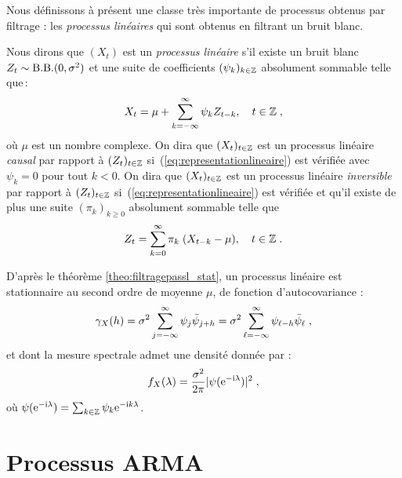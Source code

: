 Nous d\'efinissons \`a pr\'esent une classe tr\`es importante de processus
obtenus par filtrage : les \emph{processus lin\'eaires} qui sont obtenus
en filtrant un bruit blanc.
\begin{definition}
\label{def:proc_lin}
Nous dirons que $(X_{t})$ est un \emph{processus lin\'eaire} s'il existe
un bruit blanc $Z_{t} \sim \mathrm{B.B.}(0,\sigma^2)$ et une suite de coefficients
$(\psi_k)_{k \in \mathbb{Z}}$ absolument sommable telle que\,:
\begin{equation}
\label{eq:representationlineaire}
 X_{t}= \mu+\sum_{k=-\infty}^\infty \psi_k Z_{t-k},\quad t\in\mathbb{Z}\;,
\end{equation}
o\`u $\mu$ est un nombre complexe. On dira que $(X_t)_{t\in\mathbb{Z}}$ est un
processus lin\'eaire \emph{causal} par rapport \`a $(Z_t)_{t\in\mathbb{Z}}$
si~(\ref{eq:representationlineaire}) est v\'erifi\'ee avec $\psi_k=0$ pour tout
$k<0$.  On dira que $(X_t)_{t\in\mathbb{Z}}$ est un processus lin\'eaire
\emph{inversible} par rapport \`a $(Z_t)_{t\in\mathbb{Z}}$
si~(\ref{eq:representationlineaire}) est v\'erifi\'ee et qu'il existe de plus une
suite $(\pi_k)_{k\geq0}$ absolument sommable telle que
\begin{equation}
\label{eq:representationlineaireinversible}
 Z_{t}= \sum_{k=0}^\infty \pi_k \; (X_{t-k}-\mu),\quad t\in\mathbb{Z}\;.
\end{equation}
\end{definition}
D'apr\`es le th\'eor\`eme \ref{theo:filtragepassl_stat}, un processus
lin\'eaire est stationnaire au second ordre de moyenne
$\mu$, de fonction d'autocovariance :
\begin{equation}\label{eq:gamm_proc_lin}
  \gamma_X(h)= \sigma^2 \sum_{j=-\infty}^\infty \psi_j \bar{\psi}_{j+h}= \sigma^2 \sum_{\ell=-\infty}^\infty \psi_{\ell-h} \bar{\psi}_{\ell}\;,
\end{equation}
et dont la mesure spectrale admet une densit\'e  donn\'ee par :
\begin{equation}
  \label{eq:dps_modlin}
  f_X(\lambda) = \frac{\sigma^2}{2 \pi} |\psi(\mathrm{e}^{-\mathrm{i}\lambda})|^2\; ,
\end{equation}
o\`u $\psi(\mathrm{e}^{-\mathrm{i}\lambda}) = \sum_{k\in \mathbb{Z}} \psi_k \mathrm{e}^{-\mathrm{i} k \lambda}$.



\section{Processus ARMA}
\label{s:procARMA}


